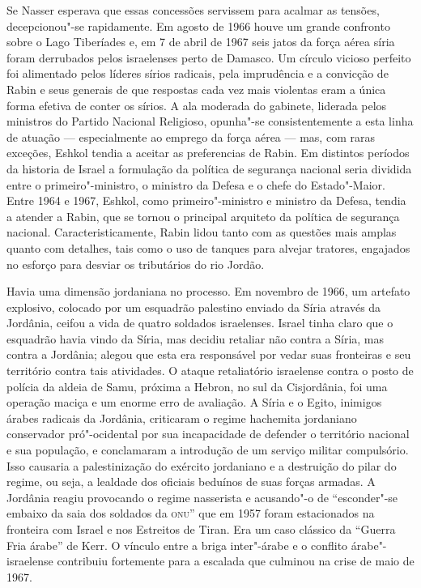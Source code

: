 Se Nasser esperava que essas concessões servissem para acalmar as
tensões, decepcionou"-se rapidamente. Em agosto de 1966 houve um grande
confronto sobre o Lago Tiberíades e, em 7 de abril de 1967 seis jatos da
força aérea síria foram derrubados pelos israelenses perto de Damasco.
Um círculo vicioso perfeito foi alimentado pelos líderes sírios
radicais, pela imprudência e a convicção de Rabin e seus generais de que
respostas cada vez mais violentas eram a única forma efetiva de conter
os sírios. A ala moderada do gabinete, liderada pelos ministros do
Partido Nacional Religioso, opunha"-se consistentemente a esta linha de
atuação --- especialmente ao emprego da força aérea --- mas, com raras
exceções, Eshkol tendia a aceitar as preferencias de Rabin. Em distintos
períodos da historia de Israel a formulação da política de segurança
nacional seria dividida entre o primeiro"-ministro, o ministro da Defesa
e o chefe do Estado"-Maior. Entre 1964 e 1967, Eshkol, como primeiro"-ministro 
e ministro da Defesa, tendia a atender a Rabin, que se tornou o
principal arquiteto da política de segurança nacional.
Caracteristicamente, Rabin lidou tanto com as questões mais amplas
quanto com detalhes, tais como o uso de tanques para alvejar tratores,
engajados no esforço para desviar os tributários do rio Jordão.

Havia uma dimensão jordaniana no processo. Em novembro de 1966, um
artefato explosivo, colocado por um esquadrão palestino enviado da Síria
através da Jordânia, ceifou a vida de quatro soldados israelenses.
Israel tinha claro que o esquadrão havia vindo da Síria, mas decidiu
retaliar não contra a Síria, mas contra a Jordânia; alegou que esta era
responsável por vedar suas fronteiras e seu território contra tais
atividades. O ataque retaliatório israelense contra o posto de polícia
da aldeia de Samu, próxima a Hebron, no sul da Cisjordânia, foi uma
operação maciça e um enorme erro de avaliação. A Síria e o Egito,
inimigos árabes radicais da Jordânia, criticaram o regime hachemita
jordaniano conservador pró"-ocidental por sua incapacidade de defender o
território nacional e sua população, e conclamaram a introdução de um
serviço militar compulsório. Isso causaria a palestinização do exército
jordaniano e a destruição do pilar do regime, ou seja, a lealdade dos
oficiais beduínos de suas forças armadas. A Jordânia reagiu provocando o
regime nasserista e acusando"-o de ``esconder"-se embaixo da saia dos
soldados da \textsc{onu}'' que em 1957 foram estacionados na fronteira com Israel
e nos Estreitos de Tiran. Era um caso clássico da ``Guerra Fria árabe''
de Kerr. O vínculo entre a briga inter"-árabe e o conflito
árabe"-israelense contribuiu fortemente para a escalada que culminou na
crise de maio de 1967.


